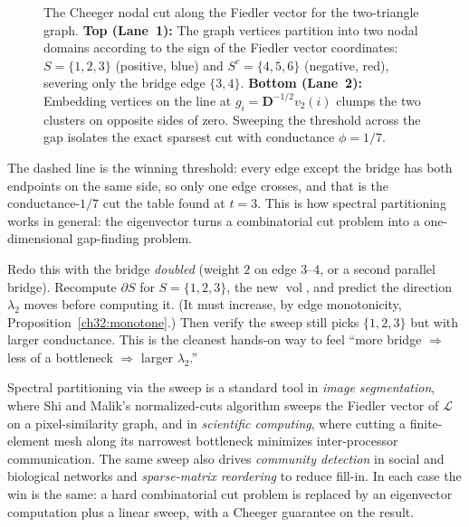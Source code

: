 \begin{figure}[H]
\caption{The Cheeger nodal cut along the Fiedler vector for the two-triangle graph. \textbf{Top (Lane~1):} The graph vertices partition into two nodal domains according to the sign of the Fiedler vector coordinates: $S=\{1,2,3\}$ (positive, blue) and $S^c=\{4,5,6\}$ (negative, red), severing only the bridge edge $\{3,4\}$. \textbf{Bottom (Lane~2):} Embedding vertices on the line at $g_i=\mathbf{D}^{-1/2}v_2(i)$ clumps the two clusters on opposite sides of zero. Sweeping the threshold across the gap isolates the exact sparsest cut with conductance $\phi = 1/7$.}
\label{ch32:fig-cheeger-nodal}
\end{figure}

The dashed line is the winning threshold: every edge except the bridge has both endpoints on the same side, so only one edge crosses, and that is the conductance-$1/7$ cut the table found at $t=3$. This is how spectral partitioning works in general: the eigenvector turns a combinatorial cut problem into a one-dimensional gap-finding problem.

\begin{labbox}
Redo this with the bridge \emph{doubled} (weight $2$ on edge $3$--$4$, or a second parallel bridge). Recompute $\partial S$ for $S=\{1,2,3\}$, the new $\operatorname{vol}$, and predict the direction $\lambda_2$ moves before computing it. (It must increase, by edge monotonicity, Proposition~\ref{ch32:monotone}.) Then verify the sweep still picks $\{1,2,3\}$ but with larger conductance. This is the cleanest hands-on way to feel ``more bridge $\Rightarrow$ less of a bottleneck $\Rightarrow$ larger $\lambda_2$.''
\end{labbox}

\begin{applicationbox}
Spectral partitioning via the sweep is a standard tool in \emph{image segmentation}, where Shi and Malik's normalized-cuts algorithm sweeps the Fiedler vector of $\mathcal{L}$ on a pixel-similarity graph, and in \emph{scientific computing}, where cutting a finite-element mesh along its narrowest bottleneck minimizes inter-processor communication. The same sweep also drives \emph{community detection} in social and biological networks and \emph{sparse-matrix reordering} to reduce fill-in. In each case the win is the same: a hard combinatorial cut problem is replaced by an eigenvector computation plus a linear sweep, with a Cheeger guarantee on the result.
\end{applicationbox}

